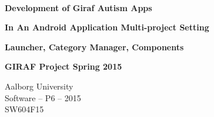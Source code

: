 
\begin{center}

	\vspace*{\fill}

	\hrulefill\newline \\

	\begin{huge}	
		\textbf{Development of Giraf Autism Apps}
	\end{huge}

	\vspace{0.6cm}

	\begin{Large}
		\textbf{In An Android Application Multi-project Setting}
	\end{Large}

	\vspace{0.6cm}

	\begin{large}
		\textbf{Launcher, Category Manager, Components}
	\end{large}

	\vspace{1cm}

	\begin{large} 
		\textbf{GIRAF Project Spring 2015}
	\end{large}

	\hrulefill\newline

	Aalborg University		\\
	Software -- P6 -- 2015	\\
	SW604F15				\\
    
	\vspace*{\fill}

\end{center}
\thispagestyle{empty}